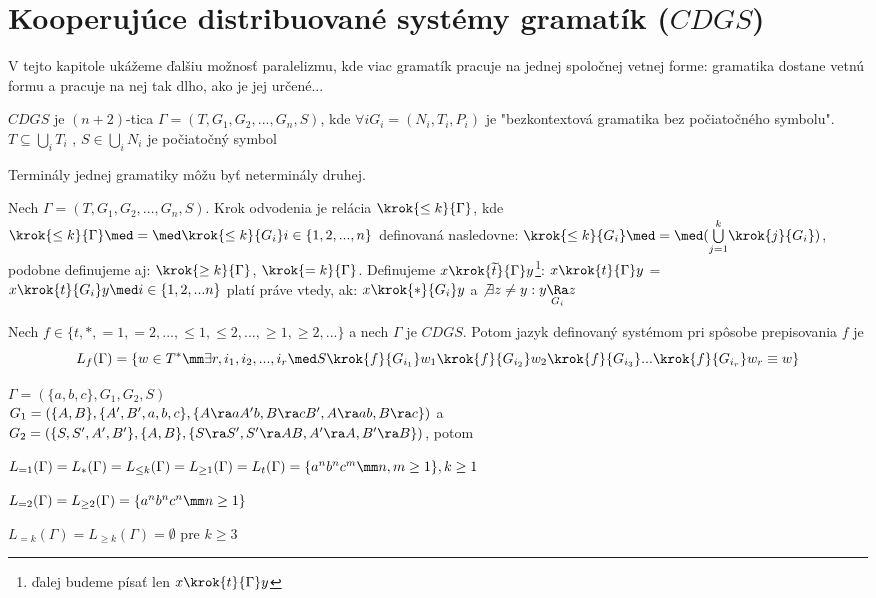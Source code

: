 \chapter{Kooperujúce distribuované systémy gramatík ($CDGS$)}

V tejto kapitole ukážeme ďalšiu možnosť paralelizmu, kde viac gramatík pracuje na jednej
spoločnej vetnej forme: gramatika dostane vetnú formu a pracuje na nej tak dlho, ako je
jej určené...

\begin{definicia}
$CDGS$ je $(n+2)$-tica $\Gamma = (T,G_1,G_2,...,G_n,S)$, kde $ \forall i G_i = (
N_i,T_i,P_i)$ je "bezkontextová gramatika bez počiatočného symbolu". $T\subseteq
\underset{i}\bigcup T_i$ , $S \in \underset{i}\bigcup N_i$ je počiatočný symbol
\end{definicia}

\begin{poznamka}
Terminály jednej gramatiky môžu byť neterminály druhej.
\end{poznamka}

\begin{definicia}
Nech $\Gamma = (T,G_1,G_2,...,G_n,S)$. Krok odvodenia je relácia $\krok{\leq k}{\Gamma}$,
kde $\krok{\leq k}{\Gamma}\med = \med\krok{\leq k}{G_i}i\in \{1,2,...,n\}$
definovaná nasledovne: $\krok{\leq k}{G_i}\med =\med (\underset{j=1} {\overset{k}\bigcup}
 \krok{j}{G_i})$, podobne definujeme aj: $\krok{\geq k}{\Gamma}$, $\krok{=k}{\Gamma} $.
Definujeme $x\krok{\widetilde{t}}{\Gamma}y$\footnote{ďalej budeme písať len $x
\krok{t}{\Gamma}y$ }: $x\krok{t}{\Gamma}y$ = $x\krok{t}{G_i} y\med i\in \{1,2,...n\}$
platí práve vtedy, ak: $x \krok{*}{G_i}y$ a $\not\exists z \not = y:
y\underset{G_i}\Ra z$
\end{definicia}

\begin{definicia}
Nech $f \in \{ t,*,=1,=2,...,\leq 1,\leq 2,...,\geq 1,\geq 2,...\}$ a nech $\Gamma$ je
$CDGS$. Potom jazyk definovaný systémom pri spôsobe prepisovania $f$ je
\[
L_f(\Gamma)=\{w \in T^* \mm \exists r,i_1,i_2,...,i_r\med S\krok{f}{G_{i_1}}w_1
\krok{f}{G_{i_2}}w_2 \krok{f}{G_{i_3}}...\krok{f}{G_{i_r}}w_r\equiv w\}
\]
\end{definicia}

\begin{priklad}
$\Gamma = (\{a,b,c\},G_1,G_2,S)$\\ $G_1 = (\{A,B\},\{A',B',a,b,c\},\{A\ra aA'b,B\ra
cB',A\ra ab, B\ra c\})$ a\\
$G_2 = (\{S,S',A',B'\},\{A,B\},\{S\ra S',S'\ra AB,A'\ra A,
B'\ra B\})$, potom
\begin{description}
\item{}$L_{=1}(\Gamma)=L_{*}(\Gamma)=L_{\leq k}(\Gamma)=L_{\geq 1}(\Gamma)=L_{t}(\Gamma)=
\{a^n b^n c^m \mm n,m\geq 1\}, k\geq 1$
\item{}$L_{=2}(\Gamma)=L_{\geq 2}(\Gamma)=\{a^n b^n c^n \mm n\geq 1 \}$
\item{}$L_{=k}(\Gamma)=L_{\geq k}(\Gamma)=\emptyset$ pre $k\geq 3$
\end{description}
\end{priklad}

